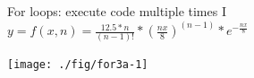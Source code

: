 \documentclass[xcolor=table,           xcolor=dvipsnames]{beamer}\usepackage[]{graphicx}\usepackage[]{color}
\newenvironment{knitrout}{}{} %
\begin{document}

\begin{frame}[fragile]{For loops: execute code multiple times I}
\hspace{5em} $y = f(x, n) = \frac{12.5*n}{(n-1)!}*(\frac{n x}{8})^{(n-1)}*e^{-\frac{n x}{8}}$
\begin{knitrout}\footnotesize
{}\color{fgcolor}

{\centering \texttt{[image: ./fig/for3a-1]} 

}



\end{knitrout}

\end{frame}

\end{document}
